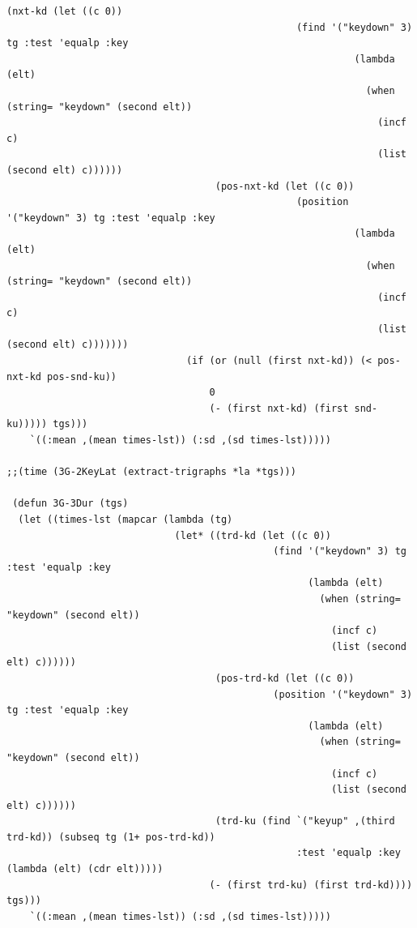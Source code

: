 \begin{lstlisting}[frame=single]
                                    (nxt-kd (let ((c 0))
                                                  (find '("keydown" 3) tg :test 'equalp :key 
                                                            (lambda (elt)
                                                              (when (string= "keydown" (second elt))
                                                                (incf c)
                                                                (list (second elt) c))))))
                                    (pos-nxt-kd (let ((c 0))
                                                  (position '("keydown" 3) tg :test 'equalp :key 
                                                            (lambda (elt)
                                                              (when (string= "keydown" (second elt))
                                                                (incf c)
                                                                (list (second elt) c)))))))
                               (if (or (null (first nxt-kd)) (< pos-nxt-kd pos-snd-ku))
                                   0
                                   (- (first nxt-kd) (first snd-ku))))) tgs)))
    `((:mean ,(mean times-lst)) (:sd ,(sd times-lst)))))

;;(time (3G-2KeyLat (extract-trigraphs *la *tgs)))

 (defun 3G-3Dur (tgs)
  (let ((times-lst (mapcar (lambda (tg)
                             (let* ((trd-kd (let ((c 0))
                                              (find '("keydown" 3) tg :test 'equalp :key 
                                                    (lambda (elt)
                                                      (when (string= "keydown" (second elt))
                                                        (incf c)
                                                        (list (second elt) c))))))
                                    (pos-trd-kd (let ((c 0))
                                              (position '("keydown" 3) tg :test 'equalp :key 
                                                    (lambda (elt)
                                                      (when (string= "keydown" (second elt))
                                                        (incf c)
                                                        (list (second elt) c))))))
                                    (trd-ku (find `("keyup" ,(third trd-kd)) (subseq tg (1+ pos-trd-kd))
                                                  :test 'equalp :key (lambda (elt) (cdr elt)))))
                                   (- (first trd-ku) (first trd-kd)))) tgs)))
    `((:mean ,(mean times-lst)) (:sd ,(sd times-lst)))))


\end{lstlisting}
